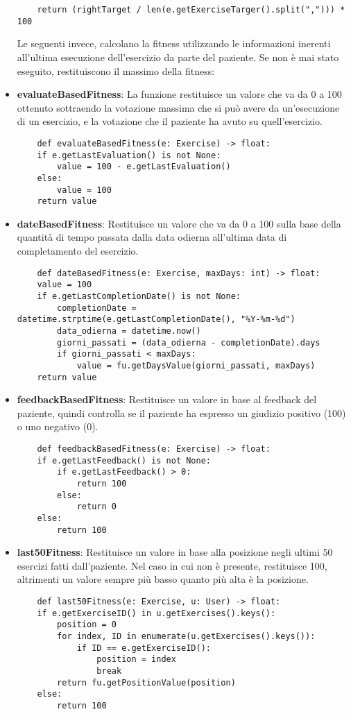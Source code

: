 \documentclass{article}
\begin{document}
\begin{itemize}
\begin{lstlisting}
    return (rightTarget / len(e.getExerciseTarger().split(","))) * 100
\end{lstlisting}

\pagebreak

Le seguenti invece, calcolano la fitness utilizzando le informazioni inerenti all'ultima esecuzione dell'esercizio da parte del paziente. Se non è mai stato eseguito, restituiscono il massimo della fitness:


\item\textbf{evaluateBasedFitness}: La funzione restituisce un valore che va da 0 a 100 ottenuto sottraendo la votazione massima che si può avere da un'esecuzione di un esercizio, e la votazione che il paziente ha avuto su quell'esercizio.
\begin{lstlisting}
    def evaluateBasedFitness(e: Exercise) -> float:
    if e.getLastEvaluation() is not None:
        value = 100 - e.getLastEvaluation()
    else:
        value = 100
    return value
\end{lstlisting}

\item\textbf{dateBasedFitness}: Restituisce un valore che va da 0 a 100 sulla base della quantità di tempo passata dalla data odierna all'ultima data di completamento del esercizio.
\begin{lstlisting}
    def dateBasedFitness(e: Exercise, maxDays: int) -> float:
    value = 100
    if e.getLastCompletionDate() is not None:
        completionDate = datetime.strptime(e.getLastCompletionDate(), "%Y-%m-%d")
        data_odierna = datetime.now()
        giorni_passati = (data_odierna - completionDate).days
        if giorni_passati < maxDays:
            value = fu.getDaysValue(giorni_passati, maxDays)
    return value
\end{lstlisting}


\item\textbf{feedbackBasedFitness}: Restituisce un valore in base al feedback del paziente, quindi controlla se il paziente ha espresso un giudizio positivo (100) o uno negativo (0).
\begin{lstlisting}
    def feedbackBasedFitness(e: Exercise) -> float:
    if e.getLastFeedback() is not None:
        if e.getLastFeedback() > 0:
            return 100
        else:
            return 0
    else:
        return 100
\end{lstlisting}

\item\textbf{last50Fitness}: Restituisce un valore in base alla posizione negli ultimi 50 esercizi fatti dall'paziente. Nel caso in cui non è presente, restituisce 100, altrimenti un valore sempre più basso quanto più alta è la posizione.
\begin{lstlisting}
    def last50Fitness(e: Exercise, u: User) -> float:
    if e.getExerciseID() in u.getExercises().keys():
        position = 0
        for index, ID in enumerate(u.getExercises().keys()):
            if ID == e.getExerciseID():
                position = index
                break
        return fu.getPositionValue(position)
    else:
        return 100
\end{lstlisting}
\end{itemize}
\end{document}
